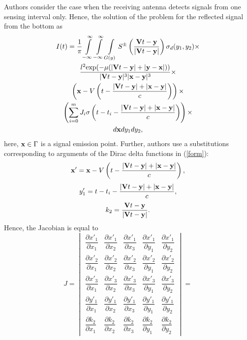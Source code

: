 \documentclass{procDDs}
\begin{document}
Authors consider the case when the receiving antenna detects signals from one sensing interval only. Hence, the solution of the problem for the reflected signal from the bottom as
\begin{multline}
	\label{form}
	I(t) = \frac{1}{\pi} \int\limits_{-\infty}^{\infty} \int\limits_{-\infty}^{\infty} \int\limits_{G(y)} S^\pm \left( \frac{\mathbf{V}t - \mathbf{y}}{|\mathbf{V}t - \mathbf{y}|} \right) \sigma_d(y_1,y_2)  \times \\
	\frac{l^2 \text{exp}(-\mu(|\mathbf{V}t-\mathbf{y}|+|\mathbf{y} - \mathbf{x}|))}{|\mathbf{V}t - \mathbf{y}|^3|\mathbf{x}-\mathbf{y}|^3}  \times \\
	\left( \mathbf{x} - V\left( t-\frac{|\mathbf{V}t-\mathbf{y}|+|\mathbf{x}-\mathbf{y}|}{c} \right) \right) \times \\
	\left( \sum_{i=0}^{m} J_i\sigma \left( t-t_i - \frac{|\mathbf{V}t-\mathbf{y}|+|\mathbf{x}-\mathbf{y}|}{c} \right)\right) \times \\
	 d\mathbf{x} dy_1 dy_2,  	 
\end{multline}
here, $\mathbf{x} \in \Gamma$ is a signal emission point. Further, authors use a substitutions corresponding to arguments of the Dirac delta functions in (\ref{form}):
\begin{equation}
	\label{form_x}
	\mathbf{x}' = \mathbf{x} - V\left( t-\frac{|\mathbf{V}t-\mathbf{y}|+|\mathbf{x}-\mathbf{y}|}{c} \right),
\end{equation}
\begin{equation}
	\label{form_y}
	y_1' = t-t_i - \frac{|\mathbf{V}t-\mathbf{y}|+|\mathbf{x}-\mathbf{y}|}{c},
\end{equation}
\begin{equation}
	\label{form_k_2}
	k_2 = \frac{\mathbf{V}t - \mathbf{y}}{|\mathbf{V}t - \mathbf{y}|}.
\end{equation}
Hence, the Jacobian is equal to
\begin{equation*}
J = \begin{vmatrix}
	\dfrac{\partial x'_1}{\partial x_1} & \dfrac{\partial x'_1}{\partial x_2} & \dfrac{\partial x'_1}{\partial x_3} & \dfrac{\partial x'_1}{\partial y_1} & \dfrac{\partial x'_1}{\partial y_2}\\
	\dfrac{\partial x'_2}{\partial x_ 1} & \dfrac{\partial x'_2}{\partial x_2} & \dfrac{\partial x'_2}{\partial x_3} & \dfrac{\partial x'_2}{\partial y_1} & \dfrac{\partial x'_2}{\partial y_2}\\
	\dfrac{\partial x'_3}{\partial x_1} & \dfrac{\partial x'_3}{\partial x_2} & \dfrac{\partial x'_3}{\partial x_3} & \dfrac{\partial x'_3}{\partial y_1} & \dfrac{\partial x'_3}{\partial y_2}\\
	\dfrac{\partial y'_1}{\partial x_1} & \dfrac{\partial y'_1}{\partial x_2} & \dfrac{\partial y'_1}{\partial x_3} & \dfrac{\partial y'_1}{\partial y_1} & \dfrac{\partial y'_1}{\partial y_2}\\
	\dfrac{\partial k_2}{\partial x_1} & \dfrac{\partial k_2}{\partial x_2} & \dfrac{\partial k_2}{\partial x_3} & \dfrac{\partial k_2}{\partial y_1} & \dfrac{\partial k_2}{\partial y_2}
\end{vmatrix} = 
\end{equation*}
\end{document}
